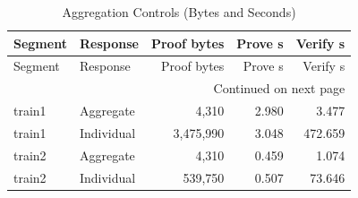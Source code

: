 \begingroup\small\setlength{\tabcolsep}{5pt}
\begin{longtable}{@{}llrrr@{}}
\caption{Aggregation Controls (Bytes and Seconds)}\label{tab:aggregation}\\
\toprule Segment & Response & Proof bytes & Prove s & Verify s\\\midrule\endfirsthead
\toprule Segment & Response & Proof bytes & Prove s & Verify s\\\midrule\endhead
\midrule\multicolumn{5}{r}{Continued on next page}\\\endfoot
\bottomrule\endlastfoot
train1 & Aggregate & 4,310 & 2.980 & 3.477\\
train1 & Individual & 3,475,990 & 3.048 & 472.659\\
train2 & Aggregate & 4,310 & 0.459 & 1.074\\
train2 & Individual & 539,750 & 0.507 & 73.646\\
\end{longtable}
\endgroup
